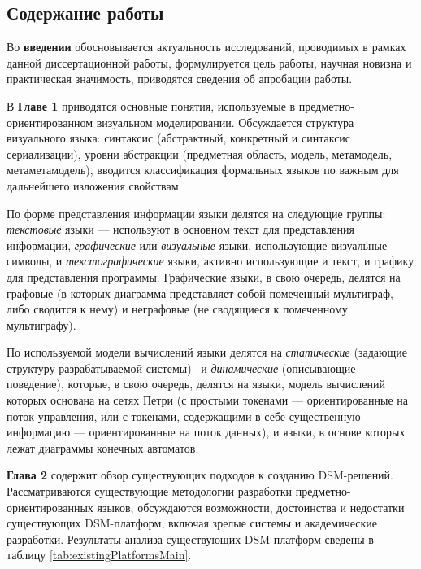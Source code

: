 \subsection*{\Large Содержание работы}
Во \textbf{введении} обосновывается актуальность исследований, проводимых в рамках 
данной диссертационной работы, формулируется цель работы, научная новизна и практическая 
значимость, приводятся сведения об апробации работы.

В \textbf{Главе 1} приводятся основные понятия, используемые в 
предметно-ориентированном визуальном моделировании. Обсуждается структура 
визуального языка: синтаксис (абстрактный, конкретный и синтаксис сериализации), 
уровни абстракции (предметная область, модель, метамодель, метаметамодель), вводится 
классификация формальных языков по важным для дальнейшего изложения свойствам.

По форме представления информации языки делятся на следующие группы: \textit{текстовые} языки 
--- используют в основном текст для представления информации, \textit{графические} или 
\textit{визуальные} языки, использующие визуальные символы, и \textit{текстографические} языки,
активно использующие и текст, и графику для представления программы. Графические языки, в свою очередь, 
делятся на графовые (в которых диаграмма представляет собой помеченный мультиграф, либо сводится к нему)
и неграфовые (не сводящиеся к помеченному мультиграфу).

По используемой модели вычислений языки делятся на \textit{статические} (задающие структуру разрабатываемой системы) \
и \textit{динамические} (описывающие поведение), которые, в свою очередь, делятся на языки, 
модель вычислений которых основана на сетях Петри (с простыми токенами --- ориентированные на поток управления,
или с токенами, содержащими в себе существенную информацию --- ориентированные на поток данных),
и языки, в основе которых лежат диаграммы конечных автоматов.

\textbf{Глава 2} содержит обзор существующих подходов к созданию DSM-решений. 
Рассматриваются существующие методологии разработки предметно-ориентированных языков,
обсуждаются возможности, достоинства и недостатки существующих DSM-платформ, 
включая зрелые системы и академические разработки. Результаты анализа существующих 
DSM-платформ сведены в таблицу \ref{tab:existingPlatformsMain}.

